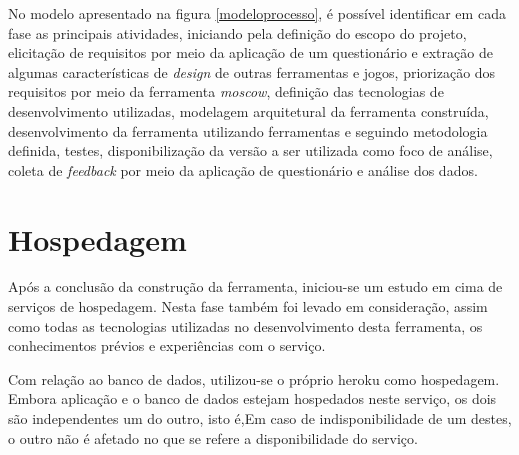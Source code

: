 No modelo apresentado na figura \ref{modeloprocesso}, é possível identificar em cada fase as principais atividades, iniciando pela definição
do escopo do projeto, elicitação de requisitos por meio da aplicação de um questionário e extração de algumas características
de \textit{design} de outras ferramentas e jogos, priorização dos requisitos por meio da ferramenta \textit{moscow},
definição das tecnologias de desenvolvimento utilizadas, modelagem arquitetural da ferramenta construída, desenvolvimento da ferramenta utilizando ferramentas e
 seguindo metodologia definida, testes, disponibilização da versão a ser utilizada como foco 
de análise, coleta de \textit{feedback} por meio da aplicação de questionário e análise dos dados.  

\section{Hospedagem}
Após a conclusão da construção da ferramenta, iniciou-se um estudo em cima de serviços de hospedagem.
Nesta fase também foi levado em consideração, assim como todas as tecnologias utilizadas no desenvolvimento desta ferramenta, os conhecimentos prévios e experiências com o serviço.

Com relação ao banco de dados, utilizou-se o próprio heroku como hospedagem. Embora aplicação e o banco de dados estejam hospedados neste serviço, os dois são independentes um do outro, isto é,Em caso de indisponibilidade de um destes, 
o outro não é afetado no que se refere a disponibilidade do serviço.
\pagebreak

